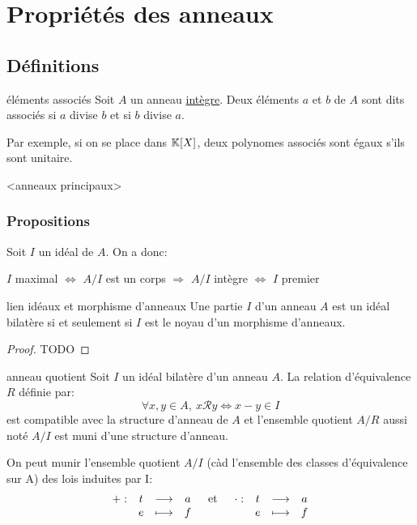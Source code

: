 \newpage

\section{Propriétés des anneaux}

\subsection{Définitions}

\begin{definition}{éléments associés}{}
    Soit $A$ un anneau \underline{intègre}.
    Deux éléments $a$ et $b$ de $A$ sont dits associés si $a$ divise $b$ et si $b$ divise $a$.
\end{definition}

Par exemple, si on se place dans $\mathbb{K}[X]$, deux polynomes associés sont égaux s'ils sont unitaire.

<anneaux principaux>



\subsubsection{Propositions}

\begin{proposition}{}{}
    Soit $I$ un idéal de $A$. On a donc:
    \begin{center}
        $I$ maximal $\Longleftrightarrow$ $A/I$ est un corps $\Longrightarrow$ $A/I$ intègre $\Longleftrightarrow$ $I$ premier
    \end{center}
\end{proposition}

\begin{theorem}{lien idéaux et morphisme d'anneaux}{}
    Une partie $I$ d'un anneau $A$ est un idéal bilatère si et seulement si $I$
    est le noyau d'un morphisme d'anneaux.
\end{theorem}

\begin{proof}
    TODO
\end{proof}

\begin{proposition}{anneau quotient}{}
    Soit $I$ un idéal bilatère d'un anneau $A$. La relation d'équivalence $R$ définie par:
    \[ \forall x, y \in A, ~ x \mathscr{R} y \Longleftrightarrow x - y \in I \]
    est compatible avec la structure d'anneau de $A$ et l'ensemble quotient $A/R$
    aussi noté $A/I$ est muni d'une structure d'anneau.
    \newline

    On peut munir l'ensemble quotient $A/I$ (càd l'ensemble des classes d'équivalence sur A) des lois induites par I:
    \[ \begin{array}{lcr}
        \begin{array}[t]{cccc}+ : & t & \longrightarrow & a \\ & e & \longmapsto & f\end{array} & \text{et} & \begin{array}[t]{cccc}\cdot : & t & \longrightarrow & a \\ & e & \longmapsto & f\end{array}
    \end{array} \]
\end{proposition}


